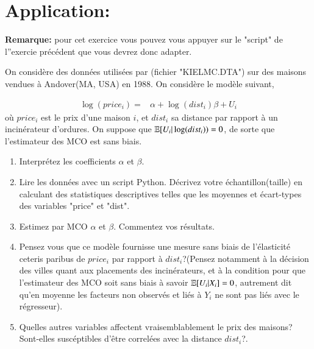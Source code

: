 \section{Application: \cite{KielMcCain1995}}
\textbf{Remarque:} pour cet exercice vous pouvez vous appuyer sur le "script" de l''exercie précédent que vous devrez donc adapter.

\medskip

On considère des données utilisées par \cite{KielMcCain1995}(fichier "KIELMC.DTA") sur des maisons vendues à Andover(MA, USA) en 1988. On considère le modèle suivant,

\begin{align*}
\log(price_i) =& \alpha + \log(dist_i)\beta + U_i
\end{align*}
où $price_i$ est le prix d'une maison $i$, et $dist_i$ sa distance par rapport à un incinérateur d'ordures. On suppose que $\mathbb{E}[U_i| \log(dist_i)) = 0$, de sorte que l'estimateur des MCO est sans biais.

 \begin{enumerate}
 \item Interprétez les coefficients $\alpha$ et $\beta$. 
\item Lire les données avec un script Python. Décrivez votre
  échantillon(taille) en calculant des statistiques descriptives
  telles que les moyennes et
  écart-types des variables "price" et "dist".
 \item Estimez par MCO $\alpha$ et $\beta$. Commentez vos résultats.
 \item Pensez vous que ce modèle fournisse une mesure sans biais de l'élasticité ceteris paribus de $price_i$ par rapport à $dist_i$?(Pensez  notamment à la décision des villes quant aux placements des incinérateurs, et à la condition pour que l'estimateur des MCO soit sans biais à savoir $\mathbb{E}[U_i|X_i] = 0$, autrement dit qu'en moyenne les facteurs non observés et liés à $Y_i$ ne sont pas liés avec le régresseur).
 \item Quelles autres variables affectent vraisemblablement le prix des
   maisons? Sont-elles suscéptibles d'être correlées avec la distance
   $dist_i$?.
 \end{enumerate}



 